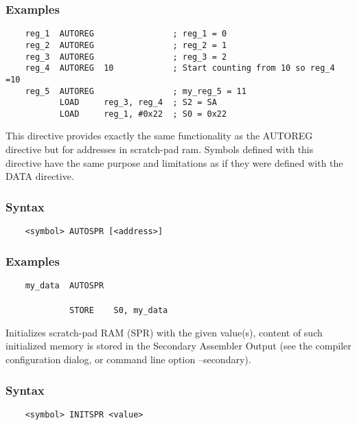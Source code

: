     \subsubsection{Examples}
        \verb'    reg_1  AUTOREG                ; reg_1 = 0'\\
        \verb'    reg_2  AUTOREG                ; reg_2 = 1'\\
        \verb'    reg_3  AUTOREG                ; reg_3 = 2'\\
        \verb'    reg_4  AUTOREG  10            ; Start counting from 10 so reg_4 =10'\\
        \verb'    reg_5  AUTOREG                ; my_reg_5 = 11'
        \verb''\\
        \verb'           LOAD     reg_3, reg_4  ; S2 = SA'\\
        \verb'           LOAD     reg_1, #0x22  ; S0 = 0x22'

    This directive provides exactly the same functionality as the AUTOREG directive but for addresses in scratch-pad ram. Symbols defined with this directive have the same purpose and limitations as if they were defined with the DATA directive.

    \subsubsection{Syntax}
        \verb'    <symbol> AUTOSPR [<address>]'

    \subsubsection{Examples}
        \verb'    my_data  AUTOSPR'\\
        \verb''\\
        \verb'             STORE    S0, my_data'

    Initializes scratch-pad RAM (SPR) with the given value(s), content of such initialized memory is stored in the Secondary Assembler Output (see the compiler configuration dialog, or command line option --secondary).

    \subsubsection{Syntax}
        \verb'    <symbol> INITSPR <value>'

